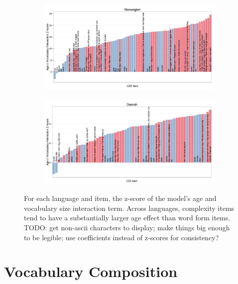 \documentclass[10pt,letterpaper]{article}
\begin{document}
\begin{figure}[!tbh]
\begin{subfigure}[b]{0.45\textwidth}
\includegraphics[width=\textwidth]{plots/norwegian_interactions}
\end{subfigure}
\begin{subfigure}[b]{0.45\textwidth}
\includegraphics[width=\textwidth]{plots/danish_interactions}
\end{subfigure}

\caption{\label{fig:interactions} For each language and item, the z-score of the model's age and vocabulary size interaction term. Across languages, complexity items tend to have a substantially larger age effect than word form items. TODO: get non-ascii characters to display; make things big enough to be legible; use coefficients instead of z-scores for consistency?}

\end{figure}


\section{Vocabulary Composition}
\end{document}
